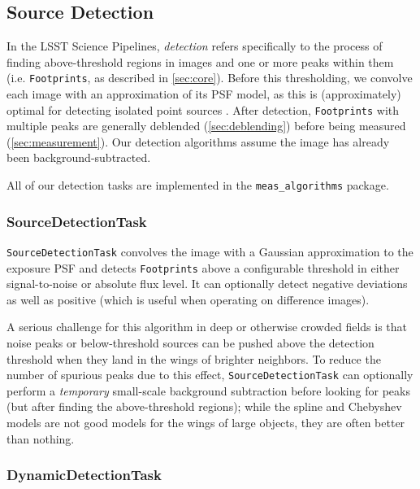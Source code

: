\subsection{Source Detection}
\label{sec:detection}

In the LSST Science Pipelines, \emph{detection} refers specifically to the process of finding above-threshold regions in images and one or more peaks within them (i.e. \texttt{Footprints}, as described in \ref{sec:core}).
Before this thresholding, we convolve each image with an approximation of its PSF model, as this is (approximately) optimal for detecting isolated point sources \citep{2018PASJ...70S...5B}.
After detection, \texttt{Footprints} with multiple peaks are generally deblended (\ref{sec:deblending}) before being measured (\ref{sec:measurement}).
Our detection algorithms assume the image has already been background-subtracted.

All of our detection tasks are implemented in the \texttt{meas\_algorithms} package.

\subsubsection{SourceDetectionTask}
\label{sec:SourceDetectionTask}

\texttt{SourceDetectionTask} convolves the image with a Gaussian approximation to the exposure PSF and detects \texttt{Footprints} above a configurable threshold in either signal-to-noise or absolute flux level.
It can optionally detect negative deviations as well as positive (which is useful when operating on difference images).

A serious challenge for this algorithm in deep or otherwise crowded fields is that noise peaks or below-threshold sources can be pushed above the detection threshold when they land in the wings of brighter neighbors.
To reduce the number of spurious peaks due to this effect, \texttt{SourceDetectionTask} can optionally perform a \emph{temporary} small-scale background subtraction before looking for peaks (but after finding the above-threshold regions); while the spline and Chebyshev models are not good models for the wings of large objects, they are often better than nothing.

\subsubsection{DynamicDetectionTask}
\label{sec:DynamicDetectionTask}

